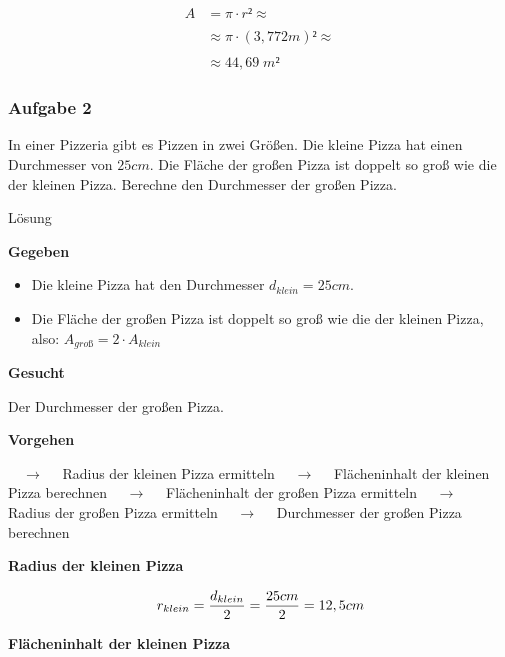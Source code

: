 \documentclass[
  ngerman,
]{book}
\providecommand{\tightlist}{%
  \setlength{\itemsep}{0pt}\setlength{\parskip}{0pt}}
\begin{document}
\[\begin{align} A &= \pi \cdot r² \approx \\
{}\\
&\approx \pi \cdot (3,772 m)²\approx\\
{}\\
&\approx 44,69\;m²\end{align}\]

\hypertarget{section-36}{%
\subsubsection*{}\label{section-36}}

\hypertarget{aufgabe-2-6}{%
\subsubsection*{Aufgabe 2}\label{aufgabe-2-6}}

In einer Pizzeria gibt es Pizzen in zwei Größen. Die kleine Pizza hat einen Durchmesser von \(25cm\). Die Fläche der großen Pizza ist doppelt so groß wie die der kleinen Pizza. Berechne den Durchmesser der großen Pizza.

Lösung

\textbf{Gegeben}

\begin{itemize}
\tightlist
\item
  Die kleine Pizza hat den Durchmesser \(d_{klein} = 25 cm\).
\item
  Die Fläche der großen Pizza ist doppelt so groß wie die der kleinen Pizza, also: \(A_{groß}= 2 \cdot A_{klein}\)
\end{itemize}

\textbf{Gesucht}

Der Durchmesser der großen Pizza.

\textbf{Vorgehen}

\(\quad \rightarrow \quad\) Radius der kleinen Pizza ermitteln \(\quad \rightarrow \quad\) Flächeninhalt der kleinen Pizza berechnen \(\quad \rightarrow \quad\) Flächeninhalt der großen Pizza ermitteln \(\quad \rightarrow \quad\) Radius der großen Pizza ermitteln \(\quad \rightarrow \quad\) Durchmesser der großen Pizza berechnen

\textbf{Radius der kleinen Pizza}

\[ r_{klein} = {d_{klein} \over 2} = {25 cm \over 2} = 12,5 cm\]

\textbf{Flächeninhalt der kleinen Pizza}
\end{document}

